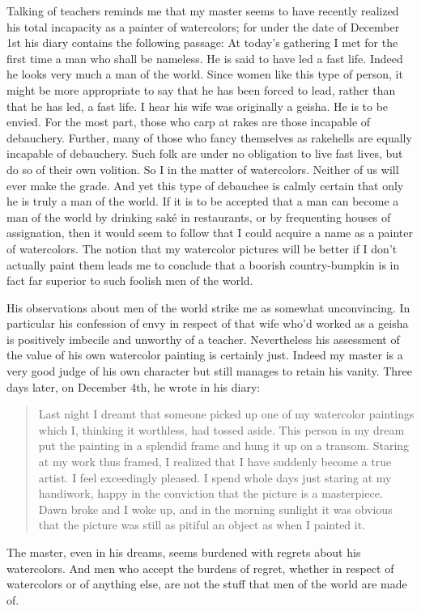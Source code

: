 \documentclass[12pt, openright]{book}
\begin{document}
Talking of teachers reminds me that my master seems to have recently
realized his total incapacity as a painter of watercolors; for under the
date of December 1st his diary contains the following passage: At
today's gathering I met for the first time a man who shall be nameless.
He is said to have led a fast life. Indeed he looks very much a man of
the world. Since women like this type of person, it might be more
appropriate to say that he has been forced to lead, rather than that he
has led, a fast life. I hear his wife was originally a geisha. He is to
be envied. For the most part, those who carp at rakes are those
incapable of debauchery. Further, many of those who fancy themselves as
rakehells are equally incapable of debauchery. Such folk are under no
obligation to live fast lives, but do so of their own volition. So I in
the matter of watercolors. Neither of us will ever make the grade. And
yet this type of debauchee is calmly certain that only he is truly a man
of the world. If it is to be accepted that a man can become a man of the
world by drinking saké in restaurants, or by frequenting houses of
assignation, then it would seem to follow that I could acquire a name as
a painter of watercolors. The notion that my watercolor pictures will be
better if I don't actually paint them leads me to conclude that a
boorish country-bumpkin is in fact far superior to such foolish men of
the world.

His observations about men of the world strike me as somewhat
unconvincing. In particular his confession of envy in respect of that
wife who'd worked as a geisha is positively imbecile and unworthy of a
teacher. Nevertheless his assessment of the value of his own watercolor
painting is certainly just. Indeed my master is a very good judge of his
own character but still manages to retain his vanity. Three days later,
on December 4th, he wrote in his diary:

\blockquote{Last night I dreamt that someone picked up one of my watercolor
paintings which I, thinking it worthless, had tossed aside. This person
in my dream put the painting in a splendid frame and hung it up on a
transom. Staring at my work thus framed, I realized that I have suddenly
become a true artist. I feel exceedingly pleased. I spend whole days
just staring at my handiwork, happy in the conviction that the picture
is a masterpiece. Dawn broke and I woke up, and in the morning sunlight
it was obvious that the picture was still as pitiful an object as when I
painted it.}

The master, even in his dreams, seems burdened with regrets about his
watercolors. And men who accept the burdens of regret, whether in
respect of watercolors or of anything else, are not the stuff that men
of the world are made of.
\end{document}
